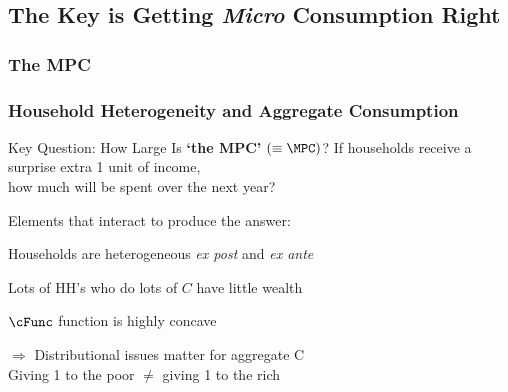 \documentclass{beamer}
\begin{document}




\subsection{The Key is Getting {\it Micro} Consumption Right}
\subsubsection{The MPC}

\begin{frame}\frametitle{Household Heterogeneity and Aggregate Consumption}

\begin{block}{Key Question: How Large Is \textbf{`the MPC'} $(\equiv \MPC)$?}
If households receive a surprise extra 1 unit of income,\\ how much will be spent over the next year?
\end{block}

\begin{block}{Elements that interact to produce the answer:}
\bi
\item Households are heterogeneous {\it ex post} and {\it ex ante}
\item Lots of HH's who do lots of $C$ have little wealth
\item $\cFunc$ function is highly concave
\item $\Rightarrow$ Distributional issues matter for aggregate C\\
Giving 1 to the poor $\ne$ giving 1 to the rich
\ei
\end{block}

\end{frame}



\end{document}
